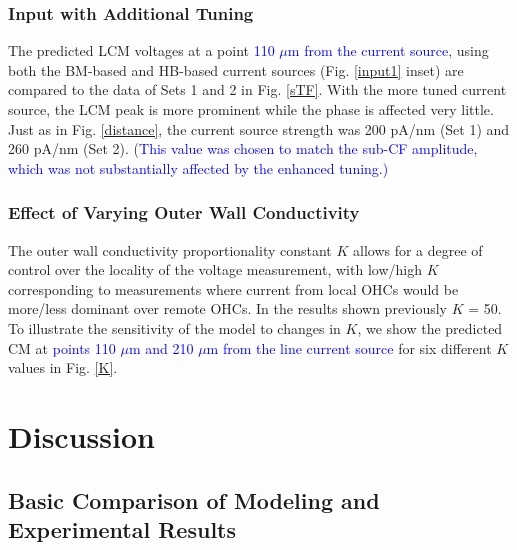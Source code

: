 \documentclass{biophys-new}
\begin{document}
\subsubsection{Input with Additional Tuning}

\par{The predicted LCM voltages at a point \textcolor{blue}{110 $\mu$m from the current source}, using both the BM-based and HB-based current sources (Fig. \ref{input1} inset) are compared to the data of Sets 1 and 2 in Fig. \ref{sTF}. With the more tuned current source, the LCM peak is more prominent while the phase is affected very little.  Just as in Fig. \ref{distance}, the current source strength was 200 pA/nm (Set 1) and 260 pA/nm (Set 2). (\textcolor{blue}{This value was chosen to match the sub-CF amplitude, which was not substantially affected by the enhanced tuning.)}}

\subsubsection{Effect of Varying Outer Wall Conductivity}
\par{The outer wall conductivity proportionality constant $K$ allows for a degree of control over the locality of the voltage measurement, with low/high $K$ corresponding to measurements where current from local OHCs would be  more/less dominant over remote OHCs. In the results shown previously $K$ = 50. To illustrate the sensitivity of the model to changes in $K$, we show the predicted CM at \textcolor{blue}{points 110 $\mu$m and 210 $\mu$m from the line current source} for six different $K$ values in Fig. \ref{K}.}

\section{Discussion}
\subsection{Basic Comparison of Modeling and Experimental Results}
\end{document}
